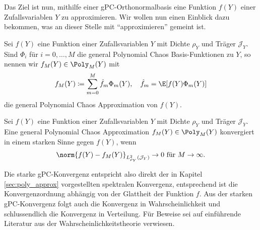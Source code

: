 Das Ziel ist nun, mithilfe einer gPC-Orthonormalbasis eine Funktion $f(Y)$ einer Zufallsvariablen $Y$ zu approximieren. Wir wollen nun einen Einblick dazu bekommen, was an dieser Stelle mit "`approximieren"' gemeint ist.
\begin{mathdef}
Sei $f(Y)$ eine Funktion einer Zufallsvariablen $Y$ mit Dichte $\rho_Y$ und Träger $\mathcal{J}_Y$. Sind $\Phi_i$ für $i=0,\dots,M$ die general Polynomial Chaos Basis-Funktionen zu $Y$, so nennen wir $f_M(Y)\in\Poly_M(Y)$ mit
\[f_M(Y)\coloneqq \sum_{m=0}^M\hat{f}_m\Phi_m(Y),\quad \hat{f}_m=\E[f(Y)\Phi_m(Y)]\]
die general Polynomial Chaos Approximation von $f(Y)$.
\end{mathdef}
\begin{mathdef}
Sei $f(Y)$ eine Funktion einer Zufallsvariablen $Y$ mit Dichte $\rho_Y$ und Träger $\mathcal{J}_Y$. Eine general Polynomial Chaos Approximation $f_M(Y)\in\Poly_M(Y)$ konvergiert in einem starken Sinne gegen $f(Y)$, wenn \[\norm{f(Y)-f_M(Y)}_{L_{\rho_Y}^2(\mathcal{J}_Y)}\to 0\text{ für }{M\to\infty}.\]
\end{mathdef}
Die starke gPC-Konvergenz entspricht also direkt der in Kapitel \ref{sec:poly_approx} vorgestellten spektralen Konvergenz, entsprechend ist die Konvergenzordnung abhängig von der Glattheit der Funktion $f$. Aus der starken gPC-Konvergenz folgt auch die Konvergenz in Wahrscheinlichkeit und schlussendlich die Konvergenz in Verteilung. Für Beweise sei auf einführende Literatur aus der Wahrscheinlichkeitstheorie verwiesen.
